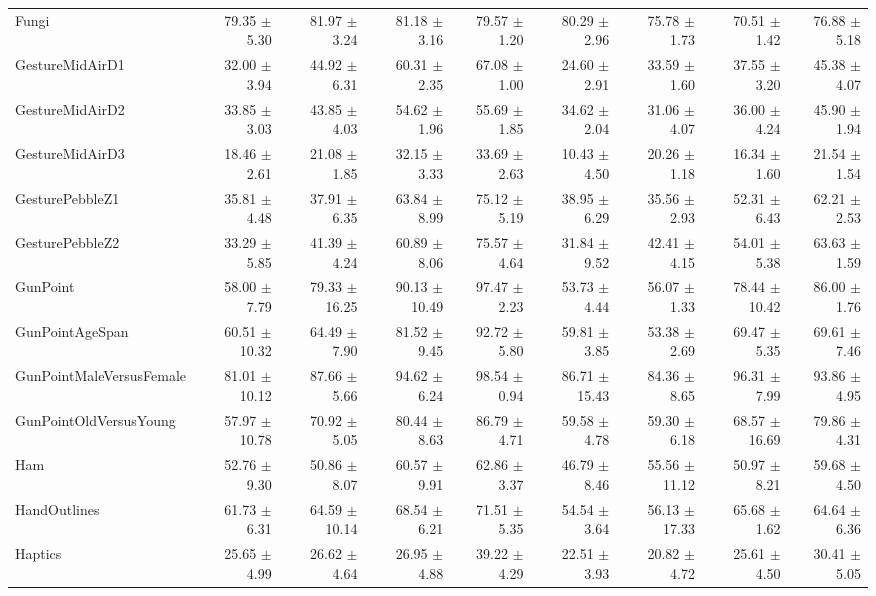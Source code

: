 \begin{landscape}
\begin{longtable}{lrrrrrrrr}
Fungi & 79.35 $\pm$ 5.30 & 81.97 $\pm$ 3.24 & 81.18 $\pm$ 3.16 & 79.57 $\pm$ 1.20 & 80.29 $\pm$ 2.96 & 75.78 $\pm$ 1.73 & 70.51 $\pm$ 1.42 & 76.88 $\pm$ 5.18 \\
GestureMidAirD1 & 32.00 $\pm$ 3.94 & 44.92 $\pm$ 6.31 & 60.31 $\pm$ 2.35 & 67.08 $\pm$ 1.00 & 24.60 $\pm$ 2.91 & 33.59 $\pm$ 1.60 & 37.55 $\pm$ 3.20 & 45.38 $\pm$ 4.07 \\
GestureMidAirD2 & 33.85 $\pm$ 3.03 & 43.85 $\pm$ 4.03 & 54.62 $\pm$ 1.96 & 55.69 $\pm$ 1.85 & 34.62 $\pm$ 2.04 & 31.06 $\pm$ 4.07 & 36.00 $\pm$ 4.24 & 45.90 $\pm$ 1.94 \\
GestureMidAirD3 & 18.46 $\pm$ 2.61 & 21.08 $\pm$ 1.85 & 32.15 $\pm$ 3.33 & 33.69 $\pm$ 2.63 & 10.43 $\pm$ 4.50 & 20.26 $\pm$ 1.18 & 16.34 $\pm$ 1.60 & 21.54 $\pm$ 1.54 \\
GesturePebbleZ1 & 35.81 $\pm$ 4.48 & 37.91 $\pm$ 6.35 & 63.84 $\pm$ 8.99 & 75.12 $\pm$ 5.19 & 38.95 $\pm$ 6.29 & 35.56 $\pm$ 2.93 & 52.31 $\pm$ 6.43 & 62.21 $\pm$ 2.53 \\
GesturePebbleZ2 & 33.29 $\pm$ 5.85 & 41.39 $\pm$ 4.24 & 60.89 $\pm$ 8.06 & 75.57 $\pm$ 4.64 & 31.84 $\pm$ 9.52 & 42.41 $\pm$ 4.15 & 54.01 $\pm$ 5.38 & 63.63 $\pm$ 1.59 \\
GunPoint & 58.00 $\pm$ 7.79 & 79.33 $\pm$ 16.25 & 90.13 $\pm$ 10.49 & 97.47 $\pm$ 2.23 & 53.73 $\pm$ 4.44 & 56.07 $\pm$ 1.33 & 78.44 $\pm$ 10.42 & 86.00 $\pm$ 1.76 \\
GunPointAgeSpan & 60.51 $\pm$ 10.32 & 64.49 $\pm$ 7.90 & 81.52 $\pm$ 9.45 & 92.72 $\pm$ 5.80 & 59.81 $\pm$ 3.85 & 53.38 $\pm$ 2.69 & 69.47 $\pm$ 5.35 & 69.61 $\pm$ 7.46 \\
GunPointMaleVersusFemale & 81.01 $\pm$ 10.12 & 87.66 $\pm$ 5.66 & 94.62 $\pm$ 6.24 & 98.54 $\pm$ 0.94 & 86.71 $\pm$ 15.43 & 84.36 $\pm$ 8.65 & 96.31 $\pm$ 7.99 & 93.86 $\pm$ 4.95 \\
GunPointOldVersusYoung & 57.97 $\pm$ 10.78 & 70.92 $\pm$ 5.05 & 80.44 $\pm$ 8.63 & 86.79 $\pm$ 4.71 & 59.58 $\pm$ 4.78 & 59.30 $\pm$ 6.18 & 68.57 $\pm$ 16.69 & 79.86 $\pm$ 4.31 \\
Ham & 52.76 $\pm$ 9.30 & 50.86 $\pm$ 8.07 & 60.57 $\pm$ 9.91 & 62.86 $\pm$ 3.37 & 46.79 $\pm$ 8.46 & 55.56 $\pm$ 11.12 & 50.97 $\pm$ 8.21 & 59.68 $\pm$ 4.50 \\
HandOutlines & 61.73 $\pm$ 6.31 & 64.59 $\pm$ 10.14 & 68.54 $\pm$ 6.21 & 71.51 $\pm$ 5.35 & 54.54 $\pm$ 3.64 & 56.13 $\pm$ 17.33 & 65.68 $\pm$ 1.62 & 64.64 $\pm$ 6.36 \\
Haptics & 25.65 $\pm$ 4.99 & 26.62 $\pm$ 4.64 & 26.95 $\pm$ 4.88 & 39.22 $\pm$ 4.29 & 22.51 $\pm$ 3.93 & 20.82 $\pm$ 4.72 & 25.61 $\pm$ 4.50 & 30.41 $\pm$ 5.05 \\

\end{longtable}
\end{landscape}
